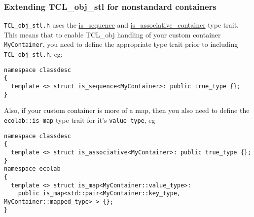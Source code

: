 \subsubsection{Extending TCL\_obj\_stl for nonstandard containers}

\verb+TCL_obj_stl.h+ uses the
\hyperref{\verb+classdesc::is_sequence+}{(see \S}{)}{is_sequence} and
\hyperref{\verb+classdesc::is_associative_container+}{}{}{is_associative_container}
type trait. This means that to enable TCL\_obj handling of your custom
container \verb+MyContainer+, you need to define the appropriate type
trait prior to including \verb+TCL_obj_stl.h+, eg:
\begin{verbatim}
namespace classdesc
{
  template <> struct is_sequence<MyContainer>: public true_type {};
}
\end{verbatim}


Also, if your custom container is more of a map, then you also need to
define the \verb+ecolab::is_map+ type trait for
it's \verb+value_type+, eg
\begin{verbatim}
namespace classdesc
{
  template <> struct is_associative<MyContainer>: public true_type {};
}
namespace ecolab
{
  template <> struct is_map<MyContainer::value_type>: 
    public is_map<std::pair<MyContainer::key_type, MyContainer::mapped_type> > {};
}
\end{verbatim}



